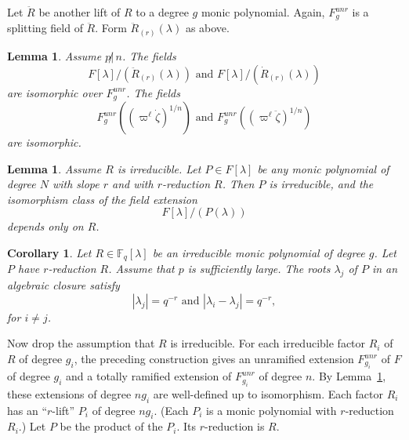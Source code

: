 \documentclass[11pt]{amsart}
\newtheorem{corollary}[theorem]{Corollary}
\newtheorem{lemma}[theorem]{Lemma}
\theoremstyle{definition}
\theoremstyle{remark}
\numberwithin{equation}{theorem}
\def\f{{\mathbb{F}_q}}
\begin{document}
Let $\ddot R$ be another lift of $R$ to a degree $g$ monic
polynomial. Again, $F^{unr}_g$ is a splitting field of $\ddot R$.
Form $\ddot R_{(r)}(\lambda)$ as above.

\begin{lemma} \label{lemma:iso} Assume $p\not | \,n$.  The fields
    \begin{equation}
    F[\lambda]/(\ddot R_{(r)}(\lambda))\text{ and }
    F[\lambda]/(\dot R_{(r)}(\lambda))
    \end{equation} are isomorphic over $F^{unr}_g$. The fields
    \begin{equation}
    F^{unr}_g((\varpi^\ell\dot\zeta)^{1/n}) \text{ and }
    F^{unr}_g((\varpi^\ell\ddot\zeta)^{1/n})\end{equation} are isomorphic.
\end{lemma}


\begin{lemma} \label{lemma:dependsonly}
Assume $R$ is irreducible.  Let $P\in F[\lambda]$ be any monic
polynomial of degree $N$ with slope $r$ and with $r$-reduction
$R$.   Then $P$ is irreducible, and the isomorphism class of the
field extension
    \begin{equation}F[\lambda]/(P(\lambda))\end{equation}
depends only on $R$.
\end{lemma}


\begin{corollary} Let $R\in\f[\lambda]$ be an irreducible monic
polynomial of degree $g$.  Let $P$ have $r$-reduction  $R$. Assume
that $p$ is sufficiently large. The roots $\lambda_j$ of $P$ in an
algebraic closure satisfy
    \begin{equation}
    |\lambda_j| = q^{-r} \text{ and } |\lambda_i-\lambda_j|= q^{-r},
    \end{equation}
for $i\ne j$.
\end{corollary}

Now drop the assumption that $R$ is irreducible.  For each
irreducible factor $R_i$ of $R$ of degree $g_i$, the preceding
construction gives an unramified extension $F^{unr}_{g_i}$ of $F$
of degree $g_i$ and a totally ramified extension of
$F^{unr}_{g_i}$ of degree $n$. By Lemma~\ref{lemma:dependsonly},
these extensions of degree $n g_i$ are well-defined up to
isomorphism. Each factor $R_i$ has an ``$r$-lift'' $P_i$ of degree
$n g_i$. (Each $P_i$ is a monic polynomial with $r$-reduction
$R_i$.) Let $P$ be the product of the $P_i$. Its $r$-reduction is
$R$.
\end{document}
